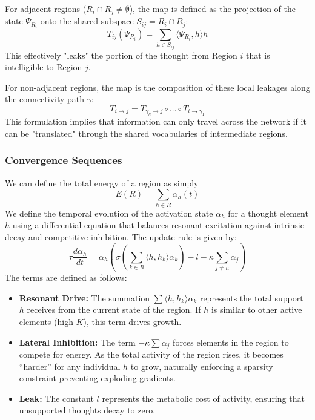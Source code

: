 \documentclass{article}
\begin{document}
For adjacent regions ($R_i \cap R_j \neq \emptyset$), the map is defined as the projection of the state $\Psi_{R_i}$ onto the shared subspace $S_{ij} = R_i \cap R_j$:
\begin{equation}
    T_{ij}(\Psi_{R_i}) = \sum_{h \in S_{ij}} \langle \Psi_{R_i}, h \rangle h
\end{equation}
This effectively "leaks" the portion of the thought from Region $i$ that is intelligible to Region $j$.

For non-adjacent regions, the map is the composition of these local leakages along the connectivity path $\gamma$:
\begin{equation}
    T_{i \to j} = T_{\gamma_k \to j} \circ \dots \circ T_{i \to \gamma_1}
\end{equation}
This formulation implies that information can only travel across the network if it can be "translated" through the shared vocabularies of intermediate regions.


\subsubsection{Convergence Sequences}
We can define the total energy of a region as simply 
\begin{equation}
    E(R) = \sum_{h \in R} \alpha_h(t)
\end{equation}
We define the temporal evolution of the activation state $\alpha_h$ for a thought element $h$ using a differential equation that balances resonant excitation against intrinsic decay and competitive inhibition. The update rule is given by:
\begin{equation}
    \tau \frac{d\alpha_h}{dt} = \alpha_h \left( \sigma\left( \sum_{k \in R} \langle h, h_k \rangle \alpha_k \right) - l - \kappa \sum_{j \ne h} \alpha_j \right)
\end{equation}
The terms are defined as follows:
\begin{itemize}
    \item \textbf{Resonant Drive:} The summation $\sum \langle h, h_k \rangle \alpha_k$ represents the total support $h$ receives from the current state of the region. If $h$ is similar to other active elements (high $K$), this term drives growth.
    \item \textbf{Lateral Inhibition:} The term $-\kappa \sum \alpha_j$ forces elements in the region to compete for energy. As the total activity of the region rises, it becomes ``harder'' for any individual $h$ to grow, naturally enforcing a sparsity constraint preventing exploding gradients.
    \item \textbf{Leak:} The constant $l$ represents the metabolic cost of activity, ensuring that unsupported thoughts decay to zero.
\end{itemize}
\end{document}
